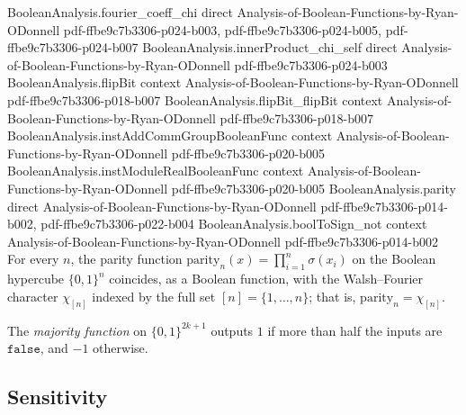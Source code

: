 \begin{lemma}
\proofstep
  {BooleanAnalysis.fourier_coeff_chi}
  {direct}
  {Analysis-of-Boolean-Functions-by-Ryan-ODonnell}
  {pdf-ffbe9c7b3306-p024-b003,
    pdf-ffbe9c7b3306-p024-b005,
    pdf-ffbe9c7b3306-p024-b007}
\proofstep
  {BooleanAnalysis.innerProduct_chi_self}
  {direct}
  {Analysis-of-Boolean-Functions-by-Ryan-ODonnell}
  {pdf-ffbe9c7b3306-p024-b003}
\proofstep
  {BooleanAnalysis.flipBit}
  {context}
  {Analysis-of-Boolean-Functions-by-Ryan-ODonnell}
  {pdf-ffbe9c7b3306-p018-b007}
\proofstep
  {BooleanAnalysis.flipBit_flipBit}
  {context}
  {Analysis-of-Boolean-Functions-by-Ryan-ODonnell}
  {pdf-ffbe9c7b3306-p018-b007}
\proofstep
  {BooleanAnalysis.instAddCommGroupBooleanFunc}
  {context}
  {Analysis-of-Boolean-Functions-by-Ryan-ODonnell}
  {pdf-ffbe9c7b3306-p020-b005}
\proofstep
  {BooleanAnalysis.instModuleRealBooleanFunc}
  {context}
  {Analysis-of-Boolean-Functions-by-Ryan-ODonnell}
  {pdf-ffbe9c7b3306-p020-b005}
\proofstep
  {BooleanAnalysis.parity}
  {direct}
  {Analysis-of-Boolean-Functions-by-Ryan-ODonnell}
  {pdf-ffbe9c7b3306-p014-b002,
    pdf-ffbe9c7b3306-p022-b004}
\proofstep
  {BooleanAnalysis.boolToSign_not}
  {context}
  {Analysis-of-Boolean-Functions-by-Ryan-ODonnell}
  {pdf-ffbe9c7b3306-p014-b002}
For every $n$, the parity function $\mathrm{parity}_n(x) = \prod_{i=1}^{n}\sigma(x_i)$
on the Boolean hypercube $\{0,1\}^n$ coincides, as a Boolean function, with the
Walsh--Fourier character $\chi_{[n]}$ indexed by the full set $[n] = \{1,\dots,n\}$;
that is, $\mathrm{parity}_n = \chi_{[n]}$.
\end{lemma}

\begin{definition}[Majority]
\label{BooleanAnalysis.majority}
\leanok
{}
The \emph{majority function} on $\{0,1\}^{2k+1}$ outputs $1$ if more than half
the inputs are $\texttt{false}$, and $-1$ otherwise.
\end{definition}

\subsection{Sensitivity}

